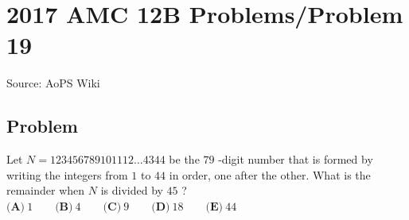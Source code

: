 \documentclass[12pt]{article}
\begin{document}
\section*{{2017 AMC 12B Problems/Problem 19}}
Source: AoPS Wiki

\subsection*{Problem}
Let $N=123456789101112\dots4344$ be the $79$ -digit number that is formed by writing the integers from $1$ to $44$ in order, one after the other. What is the remainder when $N$ is divided by $45$ ? $\textbf{(A)}\ 1\qquad\textbf{(B)}\ 4\qquad\textbf{(C)}\ 9\qquad\textbf{(D)}\ 18\qquad\textbf{(E)}\ 44$
\end{document}
